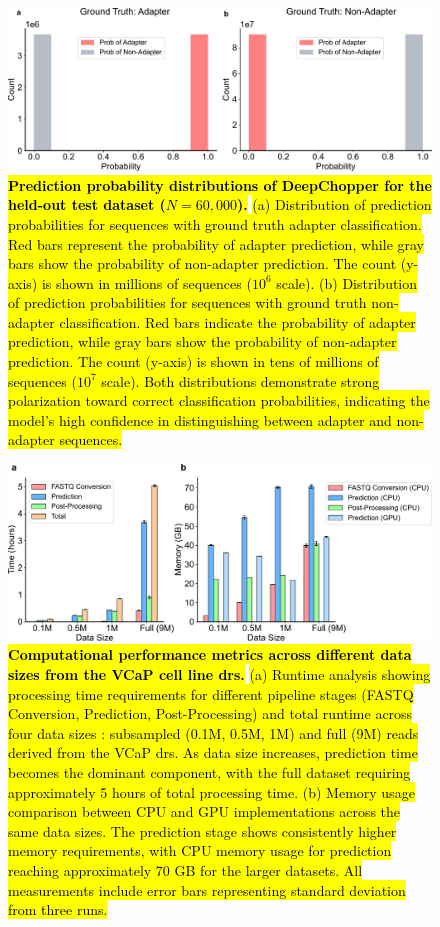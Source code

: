 \documentclass[pdflatex,sn-nature, lineno]{sn-jnl}%
\begin{document}
\begin{figure}[!ht]
	\includegraphics[height=0.35\columnwidth]{finals/adaprob}
	\caption{{\bf \hl{Prediction probability distributions of DeepChopper for the held-out test dataset  ($N=60,000$).}} \hl{(a) Distribution of prediction probabilities for sequences with ground truth adapter classification. Red bars represent the probability of adapter prediction, while gray bars show the probability of non-adapter prediction. The count (y-axis) is shown in millions of sequences ($10^6$ scale). (b) Distribution of prediction probabilities for sequences with ground truth non-adapter classification. Red bars indicate the probability of adapter prediction, while gray bars show the probability of non-adapter prediction. The count (y-axis) is shown in tens of millions of sequences ($10^7$ scale). Both distributions demonstrate strong polarization toward correct classification probabilities, indicating the model's high confidence in distinguishing between adapter and non-adapter sequences.}}\label{fig:adaprob}
\end{figure}

\begin{figure}[!ht]
	\includegraphics[height=0.4\columnwidth]{finals/sf2a}
	\caption{ {\bf \hl{Computational performance metrics across different data sizes from the VCaP cell line \mbox{\gls{drs}}.}} \hl{(a) Runtime analysis showing processing time requirements for different pipeline stages (FASTQ Conversion, Prediction, Post-Processing) and total runtime across four data sizes : subsampled (0.1M, 0.5M, 1M) and full (9M) reads derived from the VCaP \mbox{\gls{drs}}. As data size increases, prediction time becomes the dominant component, with the full dataset requiring approximately 5 hours of total processing time. (b) Memory usage comparison between CPU and GPU implementations across the same data sizes. The prediction stage shows consistently higher memory requirements, with CPU memory usage for prediction reaching approximately 70 GB for the larger datasets. All measurements include error bars representing standard deviation from three runs.}}\label{fig:sf2a}
\end{figure}
\end{document}
